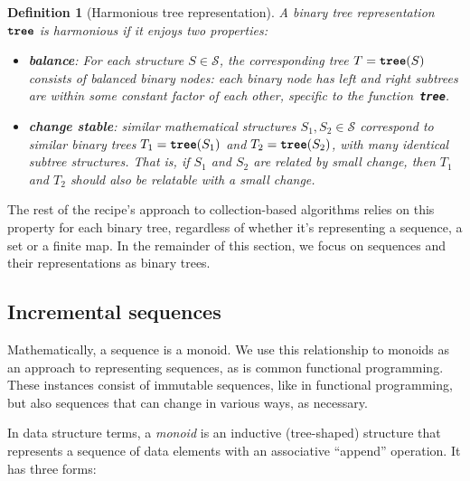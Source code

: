 \documentclass[11pt]{article}
\renewcommand{\ottkw}[1]{\textbf{\texttt{#1}}}
\newtheorem{definition}{Definition}
\begin{document}
\begin{definition}[Harmonious tree representation]
  \label{def:harmonious}
  A binary tree representation~$\ottkw{tree}$ is \emph{harmonious} if
  it enjoys two properties:
\begin{itemize}

\item \textbf{balance}: For each structure $S \in \mathcal{S}$, the
  corresponding tree $T = \ottkw{tree}(S)$ consists of \emph{balanced
  binary nodes}: each binary node has left and right subtrees are
  within some constant factor of each other, specific to the function~\ottkw{tree}.

\item \textbf{change stable}: similar mathematical structures $S_1,
  S_2 \in \mathcal{S}$ correspond to similar binary trees $T_1 =
  \ottkw{tree}(S_1)$ and $T_2 = \ottkw{tree}(S_2)$, with many
  identical subtree structures.  That is, if $S_1$ and $S_2$ are
  related by small change, then $T_1$ and $T_2$ should also be
  relatable with a small change.

\end{itemize}

\end{definition}

The rest of the recipe's approach to collection-based algorithms
relies on this property for each binary tree, regardless of
whether it's representing a sequence, a set or a finite map.
%
In the remainder of this section, we focus on sequences and their
representations as binary trees.

\subsection{Incremental sequences}

Mathematically, a sequence is a monoid.
%
We use this relationship to monoids as an approach to representing sequences,
as is common functional programming.
%
These instances consist of immutable sequences, like in functional programming,
but also sequences that can change in various ways, as necessary.

In data structure terms, a \emph{monoid} is an inductive (tree-shaped)
structure that represents a sequence of data elements with an associative ``append'' operation.
%
It has three forms:
\end{document}
